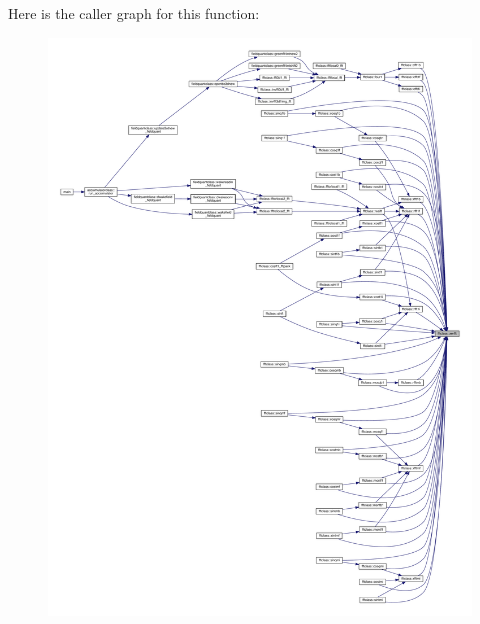 Here is the caller graph for this function\+:\nopagebreak
\begin{figure}[H]
\begin{center}
\leavevmode
\includegraphics[width=350pt]{namespacefftclass_a3e1884f0fa20142f45f2d3efe3246adc_icgraph}
\end{center}
\end{figure}
